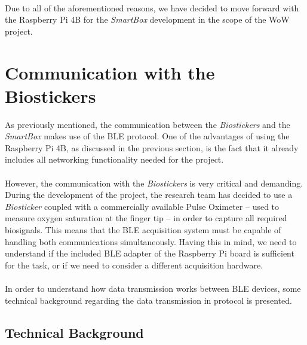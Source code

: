 \paragraph{} Due to all of the aforementioned reasons, we have decided to move forward with the Raspberry Pi 4B for the \textit{SmartBox} development in the scope of the \acs{WoW} project.

\section{Communication with the Biostickers}

As previously mentioned, the communication between the \textit{Biostickers} and the \textit{SmartBox} makes use of the \acs{BLE} protocol. One of the advantages of using the Raspberry Pi 4B, as discussed in the previous section, is the fact that it already includes all networking functionality needed for the project. 


\paragraph{} However, the communication with the \textit{Biostickers} is very critical and demanding. During the development of the project, the research team has decided to use a \textit{Biosticker} coupled with a commercially available Pulse Oximeter -- used to measure oxygen saturation at the finger tip --  in order to capture all required biosignals. This means that the \acs{BLE} acquisition system must be capable of handling both communications simultaneously. Having this in mind, we need to understand if the included \acs{BLE} adapter of the Raspberry Pi board is sufficient for the task, or if we need to consider a different acquisition hardware.

\paragraph{} In order to understand how data transmission works between \acs{BLE} devices, some technical background regarding the data transmission in protocol is presented.

\subsection{Technical Background} 

